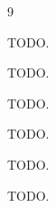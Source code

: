 \documentclass[conference]{IEEEtran}
\begin{document}
%
\begin{thebibliography}{9}

TODO.

TODO.

TODO.

TODO.

TODO.

TODO.

\end{thebibliography}
\end{document}
